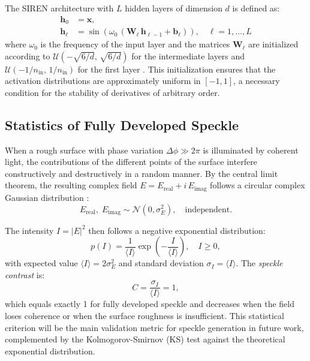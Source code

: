 The SIREN architecture with $L$ hidden layers of dimension $d$ is defined as:
%
\begin{equation}
\label{eq:siren}
\begin{aligned}
  \mathbf{h}_0 &= \mathbf{x}, \\
  \mathbf{h}_\ell &= \sin\!\left(\omega_0\,(\mathbf{W}_\ell\,\mathbf{h}_{\ell-1} + \mathbf{b}_\ell)\right),
  \quad \ell = 1, \ldots, L
\end{aligned}
\end{equation}
%
where $\omega_0$ is the frequency of the input layer and the matrices
$\mathbf{W}_\ell$ are initialized according to
$\mathcal{U}(-\sqrt{6/d},\,\sqrt{6/d})$ for the intermediate layers and
$\mathcal{U}(-1/n_{\mathrm{in}},\,1/n_{\mathrm{in}})$ for the first layer
\cite{Sitzmann2020_SIREN}.
This initialization ensures that the activation distributions are approximately
uniform in $[-1, 1]$, a necessary condition for the stability of derivatives of
arbitrary order.

\subsection{Statistics of Fully Developed Speckle}
\label{subsec:speckle}

When a rough surface with phase variation $\Delta\phi \gg 2\pi$ is illuminated by
coherent light, the contributions of the different points of the surface interfere
constructively and destructively in a random manner.
By the central limit theorem, the resulting complex field
$E = E_{\mathrm{real}} + i\,E_{\mathrm{imag}}$ follows a circular complex Gaussian
distribution \cite{Goodman2007_Speckle}:
%
\begin{equation}
  E_{\mathrm{real}},\; E_{\mathrm{imag}} \sim \mathcal{N}(0, \sigma_E^2),
  \quad \text{independent.}
  \label{eq:gaussian_field}
\end{equation}

The intensity $I = |E|^2$ then follows a negative exponential distribution:
%
\begin{equation}
  p(I) = \frac{1}{\langle I \rangle}\exp\!\left(-\frac{I}{\langle I \rangle}\right),
  \quad I \geq 0,
  \label{eq:pdf_intensity}
\end{equation}
%
with expected value $\langle I \rangle = 2\sigma_E^2$ and standard deviation
$\sigma_I = \langle I \rangle$.
The \textit{speckle contrast} is:
%
\begin{equation}
  C = \frac{\sigma_I}{\langle I \rangle} = 1,
  \label{eq:contrast}
\end{equation}
%
which equals exactly 1 for fully developed speckle and decreases when the field
loses coherence or when the surface roughness is insufficient.
This statistical criterion will be the main validation metric for speckle
generation in future work, complemented by the Kolmogorov-Smirnov (KS) test against
the theoretical exponential distribution.
